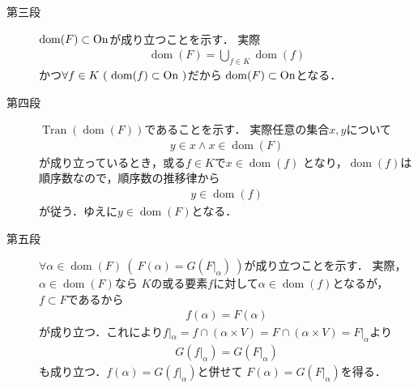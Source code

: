 \begin{prf}
\begin{description}
			\item[第三段] $\operatorname{dom}(F) \subset \mathrm{On}$が成り立つことを示す．
				実際
				\begin{align}
					\operatorname{dom}(F) = \bigcup_{f \in K} \operatorname{dom}(f)
				\end{align}
				かつ$\forall f \in K\ (\ \operatorname{dom}(f) \subset \mathrm{On}\ )$だから
				$\operatorname{dom}(F) \subset \mathrm{On}$となる．
				
			\item[第四段] $\operatorname{Tran}(\operatorname{dom}(F))$であることを示す．
				実際任意の集合$x,y$について
				\begin{align}
					y \in x \wedge x \in \operatorname{dom}(F)
				\end{align}
				が成り立っているとき，或る$f \in K$で$x \in \operatorname{dom}(f)$
				となり，$\operatorname{dom}(f)$は順序数なので，順序数の推移律から
				\begin{align}
					y \in \operatorname{dom}(f)
				\end{align}
				が従う．ゆえに$y \in \operatorname{dom}(F)$となる．
				
			\item[第五段] $\forall \alpha \in \operatorname{dom}(F)\ (\ F(\alpha) = G(F|_\alpha)\ )$が成り立つことを示す．
				実際，$\alpha \in \operatorname*{dom}(F)$なら
				$K$の或る要素$f$に対して$\alpha \in \operatorname*{dom}(f)$となるが，
				$f \subset F$であるから
				\begin{align}
					f(\alpha) = F(\alpha)
				\end{align}
				が成り立つ．これにより$f|_\alpha = f \cap (\alpha \times V)
				= F \cap (\alpha \times V) = F|_\alpha$より
				\begin{align}
					G(f|_\alpha) = G(F|_\alpha)
				\end{align}
				も成り立つ．$f(\alpha) = G(f|_\alpha)$と併せて
				$F(\alpha) = G(F|_\alpha)$を得る．
			

\end{description}
\end{prf}
